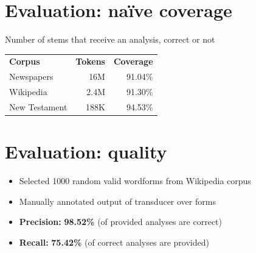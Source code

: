 \documentclass[a0paper,fleqn]{betterposter}
\begin{document}
{%


\section{Evaluation: naïve coverage}

\vspace{-2em}
Number of stems that receive an analysis, correct or not\\
\vspace{-1em}

\noindent\begin{tabular}{ l r r }
 \textbf{Corpus} & \textbf{Tokens} & \textbf{Coverage} \\ 
 Newspapers & 16M & 91.04\%  \\
 Wikipedia & 2.4M & 91.30\% \\
 New Testament & 188K & 94.53\% \\
\end{tabular}

\section{Evaluation: quality}

\vspace{-2em}
\begin{itemize}
\item Selected 1000 random valid wordforms from Wikipedia corpus
\item Manually annotated output of transducer over forms
\item \textbf{Precision:} {\color{lightgreen}\textbf{98.52\%}} (of provided analyses are correct)
\item \textbf{Recall:} {\color{orange}\textbf{75.42\%}} (of correct analyses are provided)
\end{itemize}
\vspace{-0.5em}


}
\end{document}
